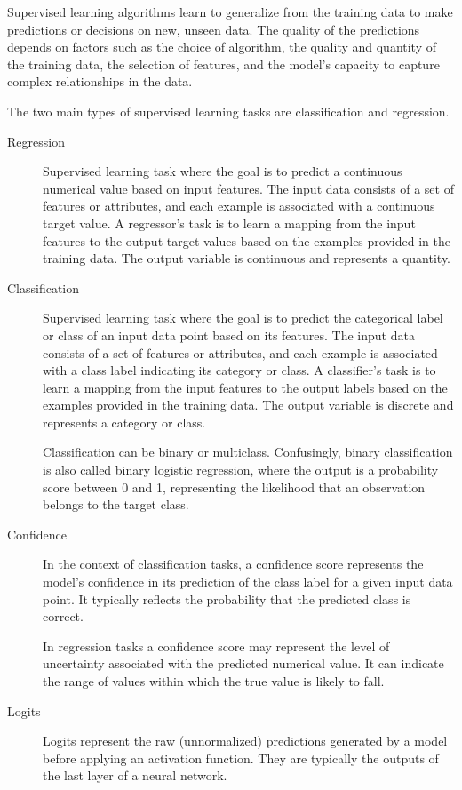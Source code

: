 \documentclass[a4paper]{article}
\begin{document}
Supervised learning algorithms learn to generalize from the training data to make predictions or decisions on new, unseen data. The quality of the predictions depends on factors such as the choice of algorithm, the quality and quantity of the training data, the selection of features, and the model's capacity to capture complex relationships in the data.

The two main types of supervised learning tasks are classification and regression.

\begin{description}
\item[Regression]
Supervised learning task where the goal is to predict a continuous numerical value based on input features. The input data consists of a set of features or attributes, and each example is associated with a continuous target value. A regressor's task is to learn a mapping from the input features to the output target values based on the examples provided in the training data. The output variable is continuous and represents a quantity.
    
\item[Classification]
Supervised learning task where the goal is to predict the categorical label or class of an input data point based on its features. The input data consists of a set of features or attributes, and each example is associated with a class label indicating its category or class. A classifier's task is to learn a mapping from the input features to the output labels based on the examples provided in the training data. The output variable is discrete and represents a category or class.

Classification can be binary or multiclass. Confusingly, binary classification is also called binary logistic regression, where the output is a probability score between 0 and 1, representing the likelihood that an observation belongs to the target class.

\item[Confidence]
In the context of classification tasks, a confidence score represents the model's confidence in its prediction of the class label for a given input data point. It typically reflects the probability that the predicted class is correct. 

In regression tasks a confidence score may represent the level of uncertainty associated with the predicted numerical value. It can indicate the range of values within which the true value is likely to fall.

\item[Logits]
Logits represent the raw (unnormalized) predictions generated by a model before applying an activation function. They are typically the outputs of the last layer of a neural network.


\end{description}
\end{document}

